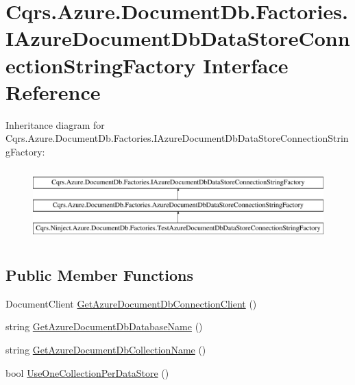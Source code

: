 \hypertarget{interfaceCqrs_1_1Azure_1_1DocumentDb_1_1Factories_1_1IAzureDocumentDbDataStoreConnectionStringFactory}{}\section{Cqrs.\+Azure.\+Document\+Db.\+Factories.\+I\+Azure\+Document\+Db\+Data\+Store\+Connection\+String\+Factory Interface Reference}
\label{interfaceCqrs_1_1Azure_1_1DocumentDb_1_1Factories_1_1IAzureDocumentDbDataStoreConnectionStringFactory}
Inheritance diagram for Cqrs.\+Azure.\+Document\+Db.\+Factories.\+I\+Azure\+Document\+Db\+Data\+Store\+Connection\+String\+Factory\+:\begin{figure}[H]
\begin{center}
\leavevmode
\includegraphics[height=2.847458cm]{interfaceCqrs_1_1Azure_1_1DocumentDb_1_1Factories_1_1IAzureDocumentDbDataStoreConnectionStringFactory}
\end{center}
\end{figure}
\subsection*{Public Member Functions}
\begin{DoxyCompactItemize}
\item 
Document\+Client \hyperlink{interfaceCqrs_1_1Azure_1_1DocumentDb_1_1Factories_1_1IAzureDocumentDbDataStoreConnectionStringFactory_ad5207c6dfcb6496aa9fb731b6453a1ee}{Get\+Azure\+Document\+Db\+Connection\+Client} ()
\item 
string \hyperlink{interfaceCqrs_1_1Azure_1_1DocumentDb_1_1Factories_1_1IAzureDocumentDbDataStoreConnectionStringFactory_aa5e3d0920e86a97aef18f4f215ce4f88}{Get\+Azure\+Document\+Db\+Database\+Name} ()
\item 
string \hyperlink{interfaceCqrs_1_1Azure_1_1DocumentDb_1_1Factories_1_1IAzureDocumentDbDataStoreConnectionStringFactory_a0ad3d0046331ea62ea2415f2c0af5675}{Get\+Azure\+Document\+Db\+Collection\+Name} ()
\item 
bool \hyperlink{interfaceCqrs_1_1Azure_1_1DocumentDb_1_1Factories_1_1IAzureDocumentDbDataStoreConnectionStringFactory_afdb9a4c6d4ada68c58413909d65e3d1c}{Use\+One\+Collection\+Per\+Data\+Store} ()
\end{DoxyCompactItemize}


